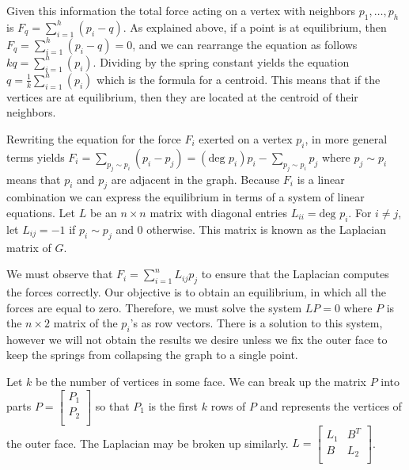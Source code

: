 \documentclass[11pt]{article}
\theoremstyle{definition}
\begin{document}
	Given this information the total force acting on a vertex with neighbors $p_1, \dots, p_h$ is $F_q = \sum_{i=1}^{h}(p_i - q)$. 
	As explained above, if a point is at equilibrium, then $F_q = \sum_{i=1}^{h}(p_i - q) = 0$, and we can rearrange the equation as follows $kq = \sum_{i=1}^{h}(p_i)$. 
	Dividing by the spring constant yields the equation $q = \frac{1}{k}\sum_{i=1}^{h}(p_i)$ which is the formula for a centroid.
	This means that if the vertices are at equilibrium, then they are located at the centroid of their neighbors.
	
	Rewriting the equation for the force $F_i$ exerted on a vertex $p_i$, in more general terms yields $F_i = \sum_{p_j \sim p_i} (p_i-p_j) = (\text{deg } p_i)p_i - \sum_{p_j \sim p_i}p_j$ where $p_j \sim p_i$ means that $p_i$ and $p_j$ are adjacent in the graph.
	Because $F_i$ is a linear combination we can express the equilibrium in terms of a system of linear equations. 
	Let $L$ be an $n \times n$ matrix with diagonal entries $L_{ii} = \text{deg }p_i$. For $i \neq j$, let $L_{ij} = -1$ if $p_i \sim p_j$ and 0 otherwise.
	This matrix is known as the Laplacian matrix of $G$.
	
	We must observe that $F_i = \sum_{i =1}^{n}L_{ij}p_j$ to ensure that the Laplacian computes the forces correctly. 
	Our objective is to obtain an equilibrium, in which all the forces are equal to zero. 
	Therefore, we must solve the system $LP = 0$ where $P$ is the $n \times 2$ matrix of the $p_i$'s as row vectors. 
	There is a solution to this system, however we will not obtain the results we desire unless we fix the outer face to keep the springs from collapsing the graph to a single point. 
	
	Let $k$ be the number of vertices in some face. We can break up the matrix $P$ into parts $P = 
		\begin{bmatrix}
    			P_1 \\
    			P_2 \\
		\end{bmatrix} $ 
	so that $P_1$ is the first $k$ rows of $P$ and represents the vertices of the outer face. The Laplacian may be broken up similarly. $L = 
		\begin{bmatrix}
			L_1 & B^T \\
			B & L_2 \\
		\end{bmatrix}$. 
		
\end{document}
